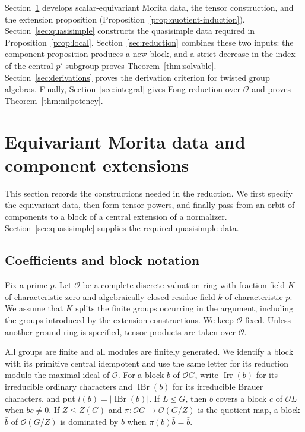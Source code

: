 \documentclass[11pt,a4paper]{article}
\theoremstyle{definition}
\theoremstyle{remark}
\numberwithin{equation}{section}
\newcommand{\cO}{\mathcal{O}}
\DeclareMathOperator{\Irr}{Irr}
\DeclareMathOperator{\IBr}{IBr}
\begin{document}
	Section~\ref{sec:preliminaries} develops scalar-equivariant Morita data,
	the tensor construction, and the extension proposition
	(Proposition~\ref{prop:quotient-induction}).
	Section~\ref{sec:quasisimple} constructs the quasisimple data required in
	Proposition~\ref{prop:local}. Section~\ref{sec:reduction} combines these
	two inputs: the component proposition produces a new block, and a strict
	decrease in the index of the central $p'$-subgroup proves
	Theorem~\ref{thm:solvable}.
	Section~\ref{sec:derivations} proves the derivation criterion for twisted group algebras. Finally, Section~\ref{sec:integral} gives Fong reduction over
	$\cO$ and proves Theorem~\ref{thm:nilpotency}.
	
	
	\section{Equivariant Morita data and component extensions}\label{sec:preliminaries}
	
	This section records the constructions needed in the reduction. We first
	specify the equivariant data, then form tensor powers, and finally pass
	from an orbit of components to a block of a central extension of a
	normalizer. Section~\ref{sec:quasisimple} supplies the required
	quasisimple data.
	
	\subsection{Coefficients and block notation}
	
	Fix a prime $p$. Let $\cO$ be a complete discrete valuation ring with fraction
	field $K$ of characteristic zero and algebraically closed residue field $k$ of
	characteristic $p$. We assume that $K$ splits the finite groups occurring in the
	argument, including the groups introduced by the extension constructions. We
	keep $\cO$ fixed. Unless another ground ring is specified, tensor products are
	taken over $\cO$.
	
	All groups are finite and all modules are finitely generated. We identify a
	block with its primitive central idempotent and use the same letter for its
	reduction modulo the maximal ideal of $\cO$. For a block $b$ of $\cO G$, write
	$\Irr(b)$ for its irreducible ordinary characters and $\IBr(b)$ for its
	irreducible Brauer characters, and put $l(b)=|\IBr(b)|$. If $L\unlhd G$,
	then $b$ covers a block $c$ of $\cO L$ when $bc\ne0$. If $Z\leq Z(G)$ and
	$\pi:\cO G\longrightarrow\cO(G/Z)$ is the quotient map, a block $\bar b$
	of $\cO(G/Z)$ is dominated by $b$ when $\pi(b)\bar b=\bar b$.
	
\end{document}
